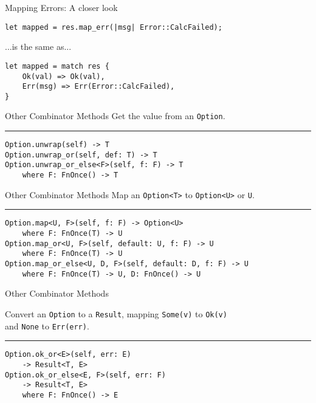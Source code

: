 \documentclass[aspectratio=1610,t]{beamer}
\newcommand\sep{\textcolor{lightgrey}{\rule{\linewidth}{0.05mm}}}
\begin{document}

\begin{frame}[fragile]{Mapping Errors: A closer look}
\begin{verbatim}
let mapped = res.map_err(|msg| Error::CalcFailed);
\end{verbatim}
...is the same as...
\begin{verbatim}
let mapped = match res {
    Ok(val) => Ok(val),
    Err(msg) => Err(Error::CalcFailed),
}
\end{verbatim}
\end{frame}


\begin{frame}[fragile]{Other Combinator Methods}
Get the value from an \texttt{Option}.
\sep
\begin{verbatim}
Option.unwrap(self) -> T
Option.unwrap_or(self, def: T) -> T
Option.unwrap_or_else<F>(self, f: F) -> T
    where F: FnOnce() -> T
\end{verbatim}
\end{frame}


\begin{frame}[fragile]{Other Combinator Methods}
Map an \texttt{Option<T>} to \texttt{Option<U>} or \texttt{U}.
\sep
\begin{verbatim}
Option.map<U, F>(self, f: F) -> Option<U>
    where F: FnOnce(T) -> U
Option.map_or<U, F>(self, default: U, f: F) -> U
    where F: FnOnce(T) -> U
Option.map_or_else<U, D, F>(self, default: D, f: F) -> U
    where F: FnOnce(T) -> U, D: FnOnce() -> U
\end{verbatim}
\end{frame}


\begin{frame}[fragile]{Other Combinator Methods}

Convert an \texttt{Option} to a \texttt{Result}, mapping \texttt{Some(v)} to
\texttt{Ok(v)}\\and \texttt{None} to \texttt{Err(err)}.
\sep
\begin{verbatim}
Option.ok_or<E>(self, err: E)
    -> Result<T, E>
Option.ok_or_else<E, F>(self, err: F)
    -> Result<T, E>
    where F: FnOnce() -> E
\end{verbatim}
\end{frame}
\end{document}
